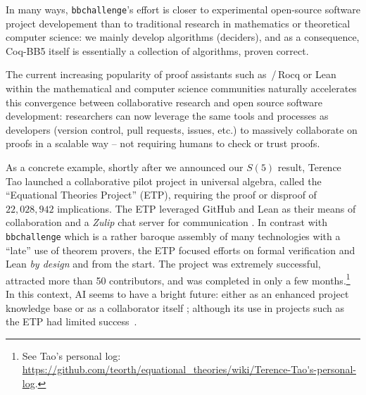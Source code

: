 \documentclass[a4paper,british]{article}
\theoremstyle{definition} %
\numberwithin{equation}{section}
\theoremstyle{definition} %
\newcommand{\CoqBB}{Coq-BB5\xspace}
\begin{document}
In many ways, \texttt{bbchallenge}'s effort is closer to experimental open-source software project developement than to traditional research in mathematics or theoretical computer science: we mainly develop algorithms (deciders), and as a consequence, \CoqBB itself is essentially a collection of algorithms, proven correct.

The current increasing popularity of proof assistants such as \Coq\,/\,Rocq or Lean within the mathematical and computer science communities naturally accelerates this convergence between collaborative research and open source software development: researchers can now leverage the same tools and processes as developers (version control, pull requests, issues, etc.) to massively collaborate on proofs in a scalable way -- \ie not requiring humans to check or trust proofs.

As a concrete example, shortly after we announced our $S(5)$ result, Terence Tao launched a collaborative pilot project in universal algebra, called the ``Equational Theories Project'' (ETP), requiring the proof or disproof of $22,028,942$ implications. The ETP leveraged GitHub and Lean as their means of collaboration and a \textit{Zulip} chat server for communication \cite{TaoBlog, ETPGithub, ETPpaper}. In contrast with \texttt{bbchallenge} which is a rather baroque assembly of many technologies with a ``late'' use of theorem provers, the ETP focused efforts on formal verification and Lean \textit{by design} and from the start. The project was extremely successful, attracted more than 50 contributors, and was completed in only a few months.\footnote{See Tao's personal log: \url{https://github.com/teorth/equational_theories/wiki/Terence-Tao's-personal-log}.} In this context, AI seems to have a bright future: either as an enhanced project knowledge base or as a collaborator itself \cite{Trinh2024, wu2024internlm25stepproveradvancingautomatedtheorem}; although its use in projects such as the ETP had limited success~\cite{ETPpaper}.



\end{document}
